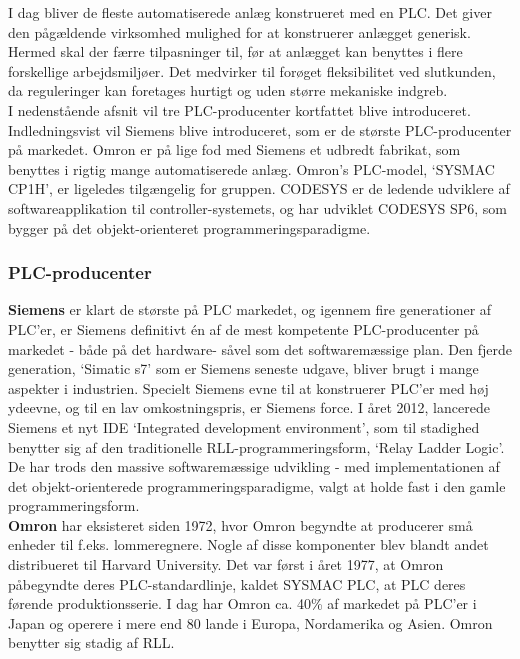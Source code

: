 I dag bliver de fleste automatiserede anlæg konstrueret med en PLC. Det giver den pågældende virksomhed mulighed for at konstruerer anlægget generisk. Hermed skal der færre tilpasninger til, før at anlægget kan benyttes i flere forskellige arbejdsmiljøer. Det medvirker til forøget fleksibilitet ved slutkunden, da reguleringer kan foretages hurtigt og uden større mekaniske indgreb.\\

\noindent I nedenstående afsnit vil tre PLC-producenter kortfattet blive introduceret. Indledningsvist vil Siemens blive introduceret, som er de største PLC-producenter på markedet. Omron er på lige fod med Siemens et udbredt fabrikat, som benyttes i rigtig mange automatiserede anlæg. Omron's PLC-model, \enquote*{SYSMAC CP1H}, er ligeledes tilgængelig for gruppen. CODESYS er de ledende udviklere af softwareapplikation til controller-systemets, og har udviklet CODESYS SP6, som bygger på det objekt-orienteret programmeringsparadigme.

\subsubsection{PLC-producenter}

\noindent\textbf{Siemens} er klart de største på PLC markedet, og igennem fire generationer af PLC'er, er Siemens definitivt én af de mest kompetente PLC-producenter på markedet - både på det hardware- såvel som det softwaremæssige plan. Den fjerde generation, \enquote*{Simatic s7} som er Siemens seneste udgave, bliver brugt i mange aspekter i industrien. Specielt Siemens evne til at konstruerer PLC'er med høj ydeevne, og til en lav omkostningspris, er Siemens force. I året 2012, lancerede Siemens et nyt IDE \enquote*{Integrated development environment}, som til stadighed benytter sig af den traditionelle RLL-programmeringsform, \enquote*{Relay Ladder Logic}. De har trods den massive softwaremæssige udvikling - med implementationen af det objekt-orienterede programmeringsparadigme, valgt at holde fast i den gamle programmeringsform. \\

\noindent\textbf{Omron} har eksisteret siden 1972, hvor Omron begyndte at producerer små enheder til f.eks. lommeregnere. Nogle af disse komponenter blev blandt andet distribueret til Harvard University. Det var først i året 1977, at Omron påbegyndte deres PLC-standardlinje, kaldet SYSMAC PLC, at PLC deres førende produktionsserie. I dag har Omron ca. 40\% af markedet på PLC'er i Japan og operere i mere end 80 lande i Europa, Nordamerika og Asien. Omron benytter sig stadig af RLL.\\

